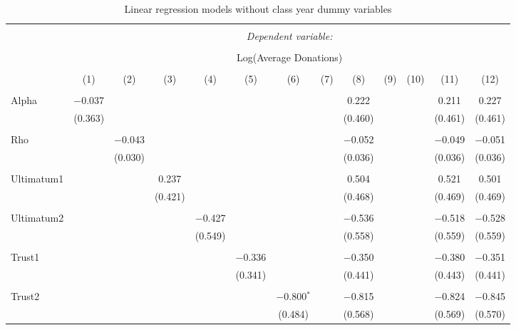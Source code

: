 \begin{subtables}
\begin{table}[H] \centering 
  \caption{Linear regression models without class year dummy variables} 
  \label{} 
   \begin{adjustbox}{width=\textwidth}
   \begin{tabular}{@{\extracolsep{5pt}}lcccccccccccc} 
\\[-1.8ex]\hline 
\hline \\[-1.8ex] 
 & \multicolumn{12}{c}{\textit{Dependent variable:}} \\ 
\cline{2-13} 
\\[-1.8ex] & \multicolumn{12}{c}{Log(Average Donations)} \\ 
\\[-1.8ex] & (1) & (2) & (3) & (4) & (5) & (6) & (7) & (8) & (9) & (10) & (11) & (12)\\ 
\hline \\[-1.8ex] 
 Alpha & $-$0.037 &  &  &  &  &  &  & 0.222 &  &  & 0.211 & 0.227 \\ 
  & (0.363) &  &  &  &  &  &  & (0.460) &  &  & (0.461) & (0.461) \\ 
  & & & & & & & & & & & & \\ 
 Rho &  & $-$0.043 &  &  &  &  &  & $-$0.052 &  &  & $-$0.049 & $-$0.051 \\ 
  &  & (0.030) &  &  &  &  &  & (0.036) &  &  & (0.036) & (0.036) \\ 
  & & & & & & & & & & & & \\ 
 Ultimatum1 &  &  & 0.237 &  &  &  &  & 0.504 &  &  & 0.521 & 0.501 \\ 
  &  &  & (0.421) &  &  &  &  & (0.468) &  &  & (0.469) & (0.469) \\ 
  & & & & & & & & & & & & \\ 
 Ultimatum2 &  &  &  & $-$0.427 &  &  &  & $-$0.536 &  &  & $-$0.518 & $-$0.528 \\ 
  &  &  &  & (0.549) &  &  &  & (0.558) &  &  & (0.559) & (0.559) \\ 
  & & & & & & & & & & & & \\ 
 Trust1 &  &  &  &  & $-$0.336 &  &  & $-$0.350 &  &  & $-$0.380 & $-$0.351 \\ 
  &  &  &  &  & (0.341) &  &  & (0.441) &  &  & (0.443) & (0.441) \\ 
  & & & & & & & & & & & & \\ 
 Trust2 &  &  &  &  &  & $-$0.800$^{*}$ &  & $-$0.815 &  &  & $-$0.824 & $-$0.845 \\ 
  &  &  &  &  &  & (0.484) &  & (0.568) &  &  & (0.569) & (0.570) \\ 

\end{tabular}
\end{adjustbox}
\end{table}
\end{subtables}
